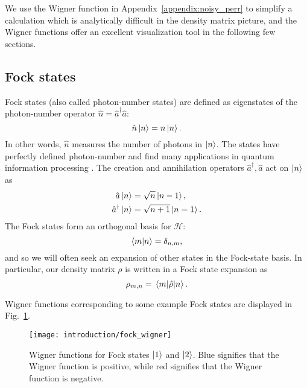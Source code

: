 We use the Wigner function in Appendix~\ref{appendix:noisy_perr} to simplify a calculation which is analytically difficult in the density matrix picture, and the Wigner functions offer an excellent visualization tool in the following few sections.


\FloatBarrier
\subsection{Fock states}
Fock states (also called photon-number states) are defined as eigenstates of the photon-number operator $\hat{n} = \hat{a}^\dagger \hat{a}$:
\begin{equation}
\hat{n} \ket{n} = n \ket{n}.
\end{equation}
In other words, $\hat{n}$ measures the number of photons in $\ket{n}$. The states have perfectly defined photon-number and find many applications in quantum information processing \cite{Bennett1984, Adami1999}. The creation and annihilation operators $\hat{a}^\dagger, \hat{a}$ act on $\ket{n}$ as 
\begin{align*}
\hat{a}\ket{n} &= \sqrt{n}\ket{n-1}, \\
\hat{a}^\dagger \ket{n} &= \sqrt{n+1} \ket{n=1}.
\end{align*}
The Fock states form an orthogonal basis for $\mathcal{H}$:
\begin{equation}
\ip{m}{n} = \delta_{n, m},
\end{equation}
and so we will often seek an expansion of other states in the Fock-state basis. In particular, our density matrix $\rho$ is written in a Fock state expansion as
\begin{equation}
\rho_{m, n} = \mel{m}{\hat{\rho}}{n}.
\end{equation}

\noindent Wigner functions corresponding to some example Fock states are displayed in Fig.~\ref{fig:intro_fock_wigner}.


\begin{figure}[htp]
\centering
\captionsetup{width=0.8\linewidth}
\texttt{[image: introduction/fock\_wigner]}
\caption{\label{fig:intro_fock_wigner} Wigner functions for Fock states $\ket{1}$ and $\ket{2}$. Blue signifies that the Wigner function is positive, while red signifies that the Wigner function is negative. }
\end{figure}



\FloatBarrier
